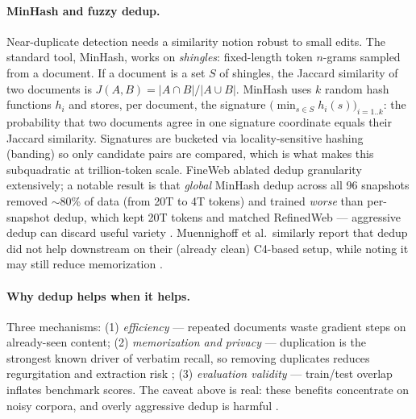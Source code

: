 \documentclass[11pt]{article}
\begin{document}
\paragraph{MinHash and fuzzy dedup.} Near-duplicate detection needs a similarity notion robust to small edits. The standard tool, MinHash, works on \emph{shingles}: fixed-length token $n$-grams sampled from a document. If a document is a set $S$ of shingles, the Jaccard similarity of two documents is $J(A,B) = |A \cap B| / |A \cup B|$. MinHash uses $k$ random hash functions $h_i$ and stores, per document, the signature $\big(\min_{s \in S} h_i(s)\big)_{i=1..k}$: the probability that two documents agree in one signature coordinate equals their Jaccard similarity. Signatures are bucketed via locality-sensitive hashing (banding) so only candidate pairs are compared, which is what makes this subquadratic at trillion-token scale. FineWeb ablated dedup granularity extensively; a notable result is that \emph{global} MinHash dedup across all 96 snapshots removed $\sim$80\% of data (from 20T to 4T tokens) and trained \emph{worse} than per-snapshot dedup, which kept 20T tokens and matched RefinedWeb --- aggressive dedup can discard useful variety \cite{penedo2024fineweb}. Muennighoff et al.\ similarly report that dedup did not help downstream on their (already clean) C4-based setup, while noting it may still reduce memorization \cite{muennighoff2023scaling}.

\paragraph{Why dedup helps when it helps.} Three mechanisms: (1) \emph{efficiency} --- repeated documents waste gradient steps on already-seen content; (2) \emph{memorization and privacy} --- duplication is the strongest known driver of verbatim recall, so removing duplicates reduces regurgitation and extraction risk \cite{lee2022deduplicating}; (3) \emph{evaluation validity} --- train/test overlap inflates benchmark scores. The caveat above is real: these benefits concentrate on noisy corpora, and overly aggressive dedup is harmful \cite{penedo2024fineweb,muennighoff2023scaling}.
\end{document}
